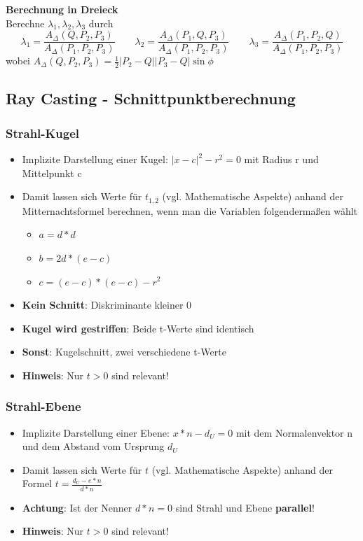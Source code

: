 \documentclass[10pt,a4paper]{article}
\begin{document}
        \textbf{Berechnung in Dreieck}\\
        Berechne \(\lambda_1, \lambda_2, \lambda_3\) durch \\
        \[\lambda_1 = \frac{A_{\Delta}(Q, P_2, P_3)}{A_\Delta(P_1, P_2, P_3)} \qquad \lambda_2 = \frac{A_{\Delta}(P_1, Q, P_3)}{A_\Delta(P_1, P_2, P_3)} \qquad \lambda_3 = \frac{A_{\Delta}(P_1, P_2, Q)}{A_\Delta(P_1, P_2, P_3)}\]
        wobei \(A_\Delta (Q, P_2, P_3) = \frac{1}{2} |P_2 - Q| | P_3 - Q | \sin \phi\)
          
	\newpage
	\subsection{Ray Casting - Schnittpunktberechnung}
	\label{rt:sub:ray_casting_schnittpunktberechnung}

	\subsubsection{Strahl-Kugel}
	\label{rt:ssub:strahl_kugel}

	\begin{itemize}
		\item Implizite Darstellung einer Kugel: $|x - c|^2 - r^2 = 0$ mit Radius r und Mittelpunkt c
		\item Damit lassen sich Werte für $t_{1,2}$ (vgl. Mathematische Aspekte) anhand der Mitternachtsformel berechnen, wenn man die Variablen folgendermaßen wählt
		\begin{itemize}
			\item $a = d * d$
			\item $b = 2d * (e - c)$
			\item $c = (e - c) * (e - c) - r^2$
		\end{itemize}
		\item \textbf{Kein Schnitt}: Diskriminante kleiner 0
		\item \textbf{Kugel wird gestriffen}: Beide t-Werte sind identisch
		\item \textbf{Sonst}: Kugelschnitt, zwei verschiedene t-Werte
		\item \textbf{Hinweis}: Nur $t > 0$ sind relevant!
	\end{itemize}

	\subsubsection{Strahl-Ebene}
	\label{rt:ssub:strahl_ebene}
	
	\begin{itemize}
		\item Implizite Darstellung einer Ebene: $x * n - d_U = 0$ mit dem Normalenvektor n und dem Abstand vom Ursprung $d_U$
		\item Damit lassen sich Werte für $t$ (vgl. Mathematische Aspekte) anhand der Formel $t = \frac{d_U - e * n}{d * n}$
		\item \textbf{Achtung}: Ist der Nenner $d * n = 0$ sind Strahl und Ebene \textbf{parallel}!
		\item \textbf{Hinweis}: Nur $t > 0$ sind relevant!
	\end{itemize}
\end{document}
